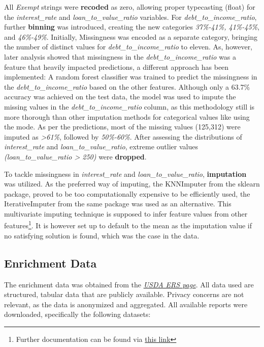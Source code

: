 All \textit{Exempt} strings were \textbf{recoded} as zero, allowing proper typecasting (float) for the \textit{interest\_rate} and \textit{loan\_to\_value\_ratio} variables. 
For \textit{debt\_to\_income\_ratio}, further \textbf{binning} was introduced, creating the new categories \textit{37\%-41\%, 41\%-45\%}, and \textit{46\%-49\%}. Initially, Missingness was encoded as a separate category, bringing the number of distinct values for \textit{debt\_to\_income\_ratio} to eleven. 
As, however, later analysis showed that missingness in the \textit{debt\_to\_income\_ratio} was a feature that heavily impacted predictions, a different approach has been implemented: A random forest classifier was trained to predict the missingness in the \textit{debt\_to\_income\_ratio} based on the other features.
Although only a 63.7\% accuracy was achieved on the test data, the model was used to impute the missing values in the \textit{debt\_to\_income\_ratio} column, as this methodology still is more thorough than other imputation methods for categorical values like using the mode. As per the predictions, most of the missing values (125,312) were imputed as \textit{>61\%}, followed by \textit{50\%-60\%}.
After assessing the distributions of \textit{interest\_rate} and \textit{loan\_to\_value\_ratio}, extreme outlier values \textit{(loan\_to\_value\_ratio > 250)} were \textbf{dropped}. 

To tackle missingness in \textit{interest\_rate} and \textit{loan\_to\_value\_ratio}, \textbf{imputation} was utilized. 
As the preferred way of imputing, the KNNImputer from the sklearn package, proved to be too computationally expensive to be efficiently used, the IterativeImputer from the same package was used as an alternative. 
This multivariate imputing technique is supposed to infer feature values from other features\footnote{Further documentation can be found via \href{https://scikit-learn.org/stable/modules/generated/sklearn.impute.IterativeImputer.html}{this link}}. It is however set up to default to the mean as the imputation value if no satisfying solution is found, which was the case in the data.

\subsection{Enrichment Data}\label{subsec:Enrichment_Data}

The enrichment data was obtained from the \textit{\href{https://www.ers.usda.gov/data-products/county-level-data-sets/}{USDA ERS page}}. All data used are structured, tabular data that are publicly available. Privacy concerns are not relevant, as the data is anonymized and aggregated. All available reports were downloaded, specifically the following datasets:

